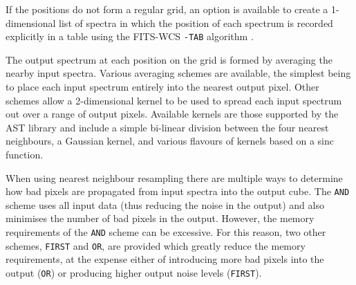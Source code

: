 \documentclass[final,authoryear,5p,times,twocolumn]{elsarticle}
\begin{document}
If the positions do not form a regular grid, an option is available to
create a 1-dimensional list of spectra in which the position of each
spectrum is recorded explicitly in a table using the FITS-WCS
\texttt{-TAB} algorithm \citep{2006A&A...446..747G}.

The output spectrum at each position on the grid is formed by
averaging the nearby input spectra. Various averaging schemes are
available, the simplest being to place each input spectrum entirely
into the nearest output pixel. Other schemes allow a 2-dimensional
kernel to be used to spread each input spectrum out over a range of
output pixels. Available kernels are those supported by the AST
library \citep{SUN211,2012ASPC..461..825B} and include a simple
bi-linear division between the four nearest neighbours, a Gaussian
kernel, and various flavours of kernels based on a sinc function.

When using nearest neighbour resampling there are multiple ways to
determine how bad pixels are propagated from input spectra into the
output cube. The \texttt{AND} scheme uses all input data (thus
reducing the noise in the output) and also minimises the number of bad
pixels in the output. However, the memory requirements of the
\texttt{AND} scheme can be excessive. For this reason, two other
schemes, \texttt{FIRST} and \texttt{OR}, are provided which greatly
reduce the memory requirements, at the expense either of introducing
more bad pixels into the output (\texttt{OR}) or producing higher
output noise levels (\texttt{FIRST}).
\end{document}
